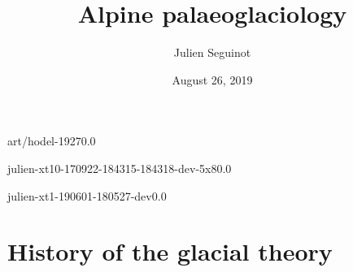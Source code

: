 

\title{Alpine palaeoglaciology}
\author{Julien Seguinot}
\date{August 26, 2019}

\usepackage{multicol}
\usepackage{CJKutf8}



\begin{CJK}{UTF8}{min}


    \centering  %

    \begin{backgroundframe}[b]{art/hodel-1927}{0.0}{}
      \flushleft{}
    \end{backgroundframe}

    \begin{backgroundframe}[b]{julien-xt10-170922-184315-184318-dev-5x8}{0.0}{}
      \flushleft{}
    \end{backgroundframe}

    \begin{backgroundframe}[b]{julien-xt1-190601-180527-dev}{0.0}{}
      \flushleft{}
    \end{backgroundframe}


\section{History of the glacial theory}


\end{CJK}
